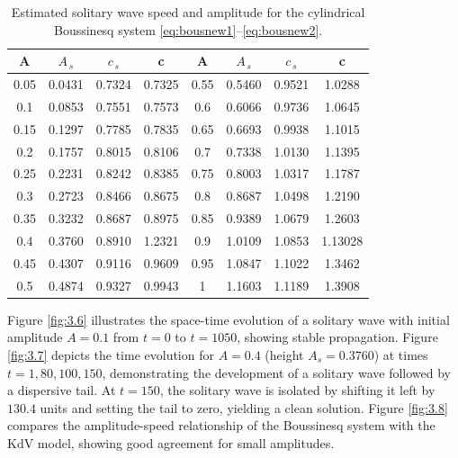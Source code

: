\documentclass[alpha-refs, 12pt]{wiley-article}
\begin{document}
\begin{table}
  \caption{\label{tab2.2} Estimated solitary wave speed and amplitude for the cylindrical Boussinesq system \eqref{eq:bousnew1}--\eqref{eq:bousnew2}.}
  \begin{center}
  \begin{tabular}{ |c       c       c       c | c       c       c       c | } 
   \hline
    A & $A_{\,s}$ & $c_{\,s}$ & c& A & $A_{\,s}$ & $c_{\,s}$ & c\\
    \hline
   0.05 & 0.0431 & 0.7324 & 0.7325& 0.55 & 0.5460 & 0.9521 & 1.0288 \\
   \hline
   0.1 & 0.0853 & 0.7551& 0.7573 & 0.6 &  0.6066 & 0.9736 & 1.0645\\ 
   \hline
   0.15 &  0.1297 & 0.7785 & 0.7835 & 0.65 & 0.6693 & 0.9938 & 1.1015\\
   \hline
   0.2 & 0.1757 & 0.8015 & 0.8106 & 0.7 &   0.7338 & 1.0130 & 1.1395\\ 
   \hline
   0.25 & 0.2231 & 0.8242 & 0.8385& 0.75 & 0.8003 & 1.0317 & 1.1787 \\
    \hline
   0.3 & 0.2723 & 0.8466 & 0.8675 & 0.8 & 0.8687 & 1.0498 & 1.2190\\
   \hline
   0.35 & 0.3232 & 0.8687 & 0.8975 & 0.85 & 0.9389  & 1.0679 & 1.2603 \\
    \hline
   0.4 &  0.3760 & 0.8910 & 1.2321 & 0.9 & 1.0109 & 1.0853 &1.13028\\
    \hline
    0.45 & 0.4307  & 0.9116 & 0.9609 & 0.95 & 1.0847&1.1022 & 1.3462  \\
    \hline
    0.5 &   0.4874 & 0.9327 & 0.9943 & 1 & 1.1603 & 1.1189 & 1.3908\\
   \hline
  \end{tabular}
  \end{center}
\end{table}

Figure \ref{fig:3.6} illustrates the space-time evolution of a solitary wave with initial amplitude $A = 0.1$ from $t = 0$ to $t = 1050$, showing stable propagation. Figure \ref{fig:3.7} depicts the time evolution for $A = 0.4$ (height $A_s = 0.3760$) at times $t = 1, 80, 100, 150$, demonstrating the development of a solitary wave followed by a dispersive tail. At $t = 150$, the solitary wave is isolated by shifting it left by $130.4$ units and setting the tail to zero, yielding a clean solution. Figure \ref{fig:3.8} compares the amplitude-speed relationship of the Boussinesq system with the KdV model, showing good agreement for small amplitudes.
\end{document}
